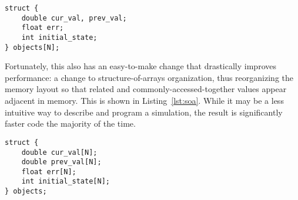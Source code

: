 \begin{minipage}{\linewidth}
	\begin{lstlisting}[frame=single,label=lst:aos,caption={[Array-of-structures organization.]Array-of-structures organization. Each attribute of a cell is declared as a field in the structure, and an array of such structures is defined. This can be an inefficient way of organizing data.}]
struct {
	double cur_val, prev_val;
	float err;
	int initial_state;
} objects[N];
\end{lstlisting}
\end{minipage}

Fortunately, this also has an easy-to-make change that drastically improves performance: a change to structure-of-arrays organization, thus reorganizing the memory layout so that related and commonly-accessed-together values
appear adjacent in memory\cite{intel-opt}. This is shown in Listing~\ref{lst:soa}. While it may be a less intuitive way to describe
and program a simulation, the result is significantly faster code the majority of the time.

\vspace{5mm}

\begin{minipage}{\linewidth}
	\begin{lstlisting}[frame=single,label=lst:soa,caption={[Structure-of-arrays organization.]Structure-of-arrays organization. Instead, now each attribute is its own array, thus placing them all in a contiguous region of memory. This organization can result in better performance.}]
struct {
	double cur_val[N];
	double prev_val[N];
	float err[N];
	int initial_state[N];
} objects;
\end{lstlisting}
\end{minipage}
















